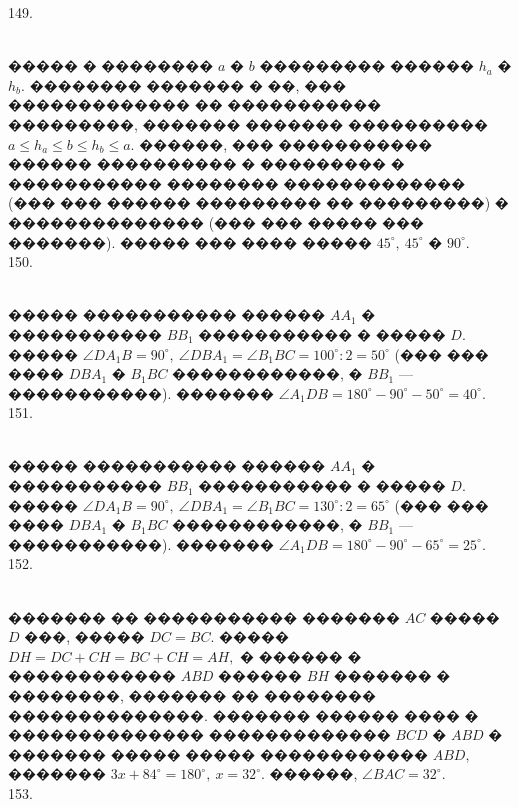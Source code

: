 \documentclass[12pt]{article}
\begin{document}
149. \begin{figure}[ht!]
\end{figure}\\
����� � �������� $a$ � $b$ ��������� ������ $h_a$ � $h_b.$ �������� ������� � ��, ��� ������������� �� ����������� ���������, ������� ������� ���������� $a\leqslant h_a\leqslant b \leqslant h_b \leqslant a.$ ������, ��� ����������� ������ ���������� � ��������� � ����������� �������� ������������� (��� ��� ������ ��������� �� ���������) � �������������� (��� ��� ����� ��� �������). ����� ��� ���� ����� $45^\circ,\ 45^\circ$ � $90^\circ.$\\
150. \begin{figure}[ht!]
\end{figure}\\
����� ����������� ������ $AA_1$ � ����������� $BB_1$ ����������� � ����� $D.$ ����� $\angle DA_1B=90^\circ,\ \angle DBA_1=\angle B_1BC=100^\circ:2=50^\circ$ (��� ��� ���� $DBA_1$ � $B_1BC$ ������������, � $BB_1$ --- �����������). ������� $\angle A_1DB=180^\circ-90^\circ-50^\circ=40^\circ.$\\
151.  \begin{figure}[ht!]
\end{figure}\\
����� ����������� ������ $AA_1$ � ����������� $BB_1$ ����������� � ����� $D.$ ����� $\angle DA_1B=90^\circ,\ \angle DBA_1=\angle B_1BC=130^\circ:2=65^\circ$ (��� ��� ���� $DBA_1$ � $B_1BC$ ������������, � $BB_1$ --- �����������). ������� $\angle A_1DB=180^\circ-90^\circ-65^\circ=25^\circ.$\\
152. \begin{figure}[ht!]
\end{figure}\\
������� �� ����������� ������� $AC$ ����� $D$ ���, ����� $DC=BC.$ ����� $DH=DC+CH=BC+CH=AH,$ � ������ � ������������ $ABD$ ������ $BH$ ������� � ��������, ������� �� �������� ��������������. ������� ������ ���� � �������������� ������������� $BCD$ � $ABD$ � ������� ����� ����� ������������ $ABD,$ ������� $3x+84^\circ=180^\circ,\ x=32^\circ.$ ������, $\angle BAC=32^\circ.$\\
153. \begin{figure}[ht!]
\end{figure}\\
\end{document}
